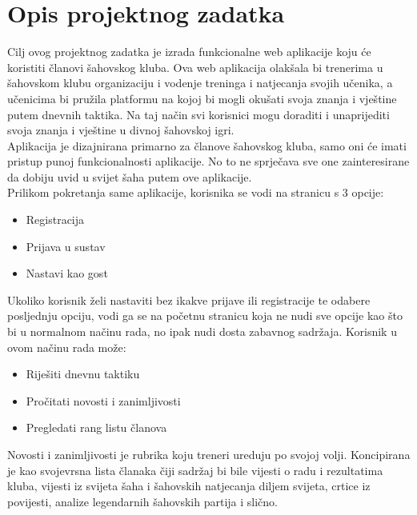 \documentclass{article}
\begin{document}
\newenvironment{packed_enum}{
	\begin{enumerate}
		\setlength{\itemsep}{0pt}
		\setlength{\parskip}{0pt}
		\setlength{\parsep}{0pt}
	}{\end{enumerate}}

\newenvironment{packed_item}{
	\begin{itemize}
		\setlength{\itemsep}{0pt}
		\setlength{\parskip}{0pt}
		\setlength{\parsep}{0pt}
	}{\end{itemize}}

	\section{Opis projektnog zadatka}
		Cilj ovog projektnog zadatka je izrada funkcionalne web aplikacije koju će koristiti članovi šahovskog kluba. Ova web aplikacija olakšala bi trenerima u šahovskom klubu organizaciju i vodenje treninga i natjecanja svojih učenika, a učenicima bi pružila platformu na kojoj bi mogli okušati svoja znanja i vještine putem dnevnih taktika. Na taj način svi korisnici mogu doraditi i unaprijediti svoja znanja i vještine u divnoj šahovskoj igri. \\ 
		Aplikacija je dizajnirana primarno za članove šahovskog kluba, samo oni će imati pristup punoj funkcionalnosti aplikacije. No to ne sprječava sve one zainteresirane da dobiju uvid u svijet šaha putem ove aplikacije. \\
		Prilikom pokretanja same aplikacije, korisnika se vodi na stranicu s 3 opcije:
		\begin{itemize}
			\item Registracija
			\item Prijava u sustav
			\item  Nastavi kao gost
		\end{itemize}
		Ukoliko korisnik želi nastaviti bez ikakve prijave ili registracije te odabere posljednju opciju, vodi ga se na početnu stranicu koja ne nudi sve opcije kao što bi u normalnom načinu rada, no ipak nudi dosta zabavnog sadržaja. Korisnik u ovom načinu rada može:
		\begin{itemize}
			\item Riješiti dnevnu taktiku 
			\item Pročitati novosti i zanimljivosti 
			\item Pregledati rang listu članova 
		\end{itemize}
		Novosti i zanimljivosti je rubrika koju treneri ureduju po svojoj volji. Koncipirana je kao svojevrsna lista članaka čiji sadržaj bi bile vijesti o radu i rezultatima kluba, vijesti iz svijeta šaha i šahovskih natjecanja diljem svijeta, crtice iz povijesti, analize legendarnih šahovskih partija i slično. 
		
\end{document}
